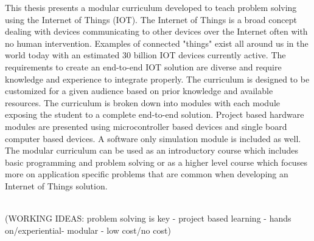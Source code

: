 \begin{sloppypar}
This thesis presents a modular curriculum developed to teach 
problem solving using the Internet of Things (IOT).  The Internet of Things is a broad concept dealing with devices communicating to other devices over the Internet often with no human intervention.   Examples of connected "things" exist all around us in the world today with an estimated 30 billion IOT devices currently active\cite{8720135}.  The requirements to create an end-to-end IOT solution are diverse and require knowledge and experience to integrate properly.   The curriculum is designed to be customized for a given audience based on prior knowledge and available resources.  The curriculum is broken down into modules with each module exposing the student to a complete end-to-end solution.  Project based hardware modules are presented using microcontroller based devices and single board computer based devices.  A software only simulation module is included as well.  The modular curriculum can be used as an introductory course which includes basic programming and problem solving or as a higher level course which focuses more on application specific problems that are common when developing an Internet of Things solution.  


\\(WORKING IDEAS: problem solving is key - 
project based learning - 
hands on/experiential- 
modular - 
low cost/no cost)

\newpage
\end{sloppypar}
%
%
